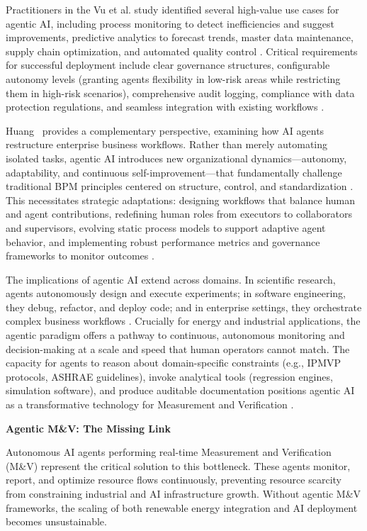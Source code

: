 \documentclass[11pt,a4paper]{article}
\begin{document}
\begin{itemize}
    Practitioners in the Vu et al. study identified several high-value use cases for agentic AI, including process monitoring to detect inefficiencies and suggest improvements, predictive analytics to forecast trends, master data maintenance, supply chain optimization, and automated quality control \cite{vu2025abpm}. Critical requirements for successful deployment include clear governance structures, configurable autonomy levels (granting agents flexibility in low-risk areas while restricting them in high-risk scenarios), comprehensive audit logging, compliance with data protection regulations, and seamless integration with existing workflows \cite{vu2025abpm, rosemann2024bpmai}.

    Huang~\cite{huang2025agents} provides a complementary perspective, examining how AI agents restructure enterprise business workflows. Rather than merely automating isolated tasks, agentic AI introduces new organizational dynamics—autonomy, adaptability, and continuous self-improvement—that fundamentally challenge traditional BPM principles centered on structure, control, and standardization \cite{huang2025agents, bennoit2024llmbpm}. This necessitates strategic adaptations: designing workflows that balance human and agent contributions, redefining human roles from executors to collaborators and supervisors, evolving static process models to support adaptive agent behavior, and implementing robust performance metrics and governance frameworks to monitor outcomes \cite{vu2025abpm, huang2025agents, vidgof2023llmbpm}.

    The implications of agentic AI extend across domains. In scientific research, agents autonomously design and execute experiments; in software engineering, they debug, refactor, and deploy code; and in enterprise settings, they orchestrate complex business workflows \cite{durante2024agentai, weng2023agents}. Crucially for energy and industrial applications, the agentic paradigm offers a pathway to continuous, autonomous monitoring and decision-making at a scale and speed that human operators cannot match. The capacity for agents to reason about domain-specific constraints (e.g., IPMVP protocols, ASHRAE guidelines), invoke analytical tools (regression engines, simulation software), and produce auditable documentation positions agentic AI as a transformative technology for Measurement and Verification \cite{chase2022langchain, xi2023agents}.

    \textbf{Agentic M\&V: The Missing Link}
    
    Autonomous AI agents performing real-time Measurement and Verification (M\&V) represent the critical solution to this bottleneck. These agents monitor, report, and optimize resource flows continuously, preventing resource scarcity from constraining industrial and AI infrastructure growth. Without agentic M\&V frameworks, the scaling of both renewable energy integration and AI deployment becomes unsustainable.


\end{itemize}
\end{document}
